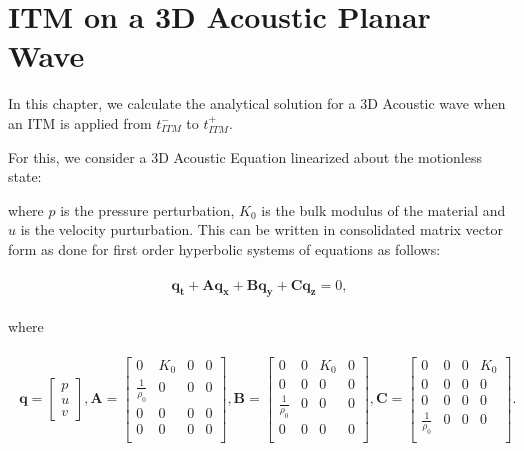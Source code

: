 \chapter{\ac{ITM} on a 3D Acoustic Planar Wave}\label{chapter:3DITMAcoustic}
In this chapter, we calculate the analytical solution for a 3D Acoustic wave when an \ac{ITM} is applied from $t_{ITM}^-$ to $t_{ITM}^+$.

For this, we consider a 3D Acoustic Equation linearized about the motionless state:

where $p$ is the pressure perturbation, $K_0$ is the bulk modulus of the material and $u$ is the velocity purturbation. 
This can be written in consolidated matrix vector form as done for first order hyperbolic systems of equations as follows:

\begin{align}
    \begin{split}
        \mathbf{q_t} + \mathbf{Aq_x} + \mathbf{Bq_y} + \mathbf{Cq_z} = 0,
    \end{split}
    \label{eq:3Dacoustic}
\end{align}

where 

\begin{align}
    \begin{split}
        \mathbf{q} = \begin{bmatrix}
            p \\
            u \\
            v
        \end{bmatrix},
        \mathbf{A} = \begin{bmatrix}
            0 & K_0 & 0 & 0 \\
            \frac{1}{\rho_0} & 0 & 0 & 0 \\
            0 & 0 & 0 & 0 \\
            0 & 0 & 0 & 0 \\
        \end{bmatrix},
        \mathbf{B} = \begin{bmatrix}
            0 & 0 & K_0 & 0 \\
            0 & 0 & 0 & 0 \\
            \frac{1}{\rho_0} & 0 & 0 & 0 \\
            0 & 0 & 0 & 0 \\
        \end{bmatrix},
        \mathbf{C} = \begin{bmatrix}
            0 & 0 & 0 & K_0 \\
            0 & 0 & 0 & 0 \\
            0 & 0 & 0 & 0 \\
            \frac{1}{\rho_0} & 0 & 0 & 0 \\
        \end{bmatrix}.
    \end{split}
\end{align}

